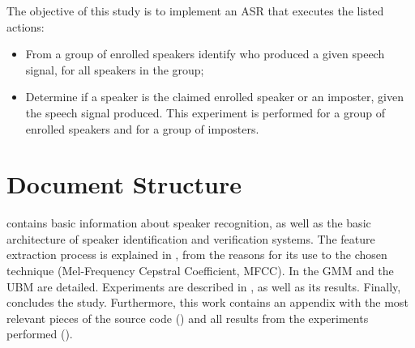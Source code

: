 The objective of this study is to implement an ASR that executes the listed actions:

\begin{itemize}\itemsep0pt
    \item From a group of enrolled speakers identify who produced a given speech signal, for all speakers in the group;
    \item Determine if a speaker is the claimed enrolled speaker or an imposter, given the speech signal produced. This experiment is performed for a group of enrolled speakers and for a group of imposters.
\end{itemize}

\section{Document Structure}

 contains basic information about speaker recognition, as well as the basic architecture of speaker identification and verification systems. The feature extraction process is explained in , from the reasons for its use to the chosen technique (Mel-Frequency Cepstral Coefficient, MFCC). In  the GMM and the UBM are detailed. Experiments are described in , as well as its results. Finally,  concludes the study. Furthermore, this work contains an appendix with the most relevant pieces of the source code () and all results from the experiments performed ().